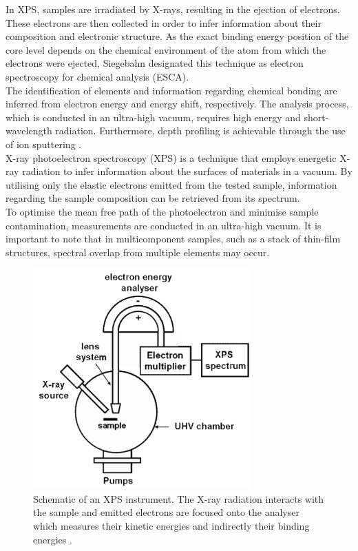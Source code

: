 \noindent In XPS, samples are irradiated by X-rays, resulting in the ejection of electrons. These electrons are then collected in order to infer information about their composition and electronic structure. As the exact binding energy position of the core level depends on the chemical environment of the atom from which the electrons were ejected, Siegebahn designated this technique as electron spectroscopy for chemical analysis (ESCA).\\

\noindent The identification of elements and information regarding chemical bonding are inferred from electron energy and energy shift, respectively. The analysis process, which is conducted in an ultra-high vacuum, requires high energy and short-wavelength radiation. Furthermore, depth profiling is achievable through the use of ion sputtering \cite{oswald2006x}.\\

\noindent X-ray photoelectron spectroscopy (XPS) is a technique that employs energetic X-ray radiation to infer information about the surfaces of materials in a vacuum. By utilising only the elastic electrons emitted from the tested sample, information regarding the sample composition can be retrieved from its spectrum.\\

\noindent To optimise the mean free path of the photoelectron and minimise sample contamination, measurements are conducted in an ultra-high vacuum. It is important to note that in multicomponent samples, such as a stack of thin-film structures, spectral overlap from multiple elements may occur.\\

\begin{figure}[htbp!] 
\centering    
\includegraphics[width=0.75\textwidth]{Chapter2/Figs/2f.png}
\caption[Schematic representation of an XPS system.]{Schematic of an XPS instrument. The X-ray radiation interacts with the sample and emitted electrons are focused onto the analyser which measures their kinetic energies and indirectly their binding energies \cite{regonini2008anodised}. }
\label{fig:2f}
\end{figure}

